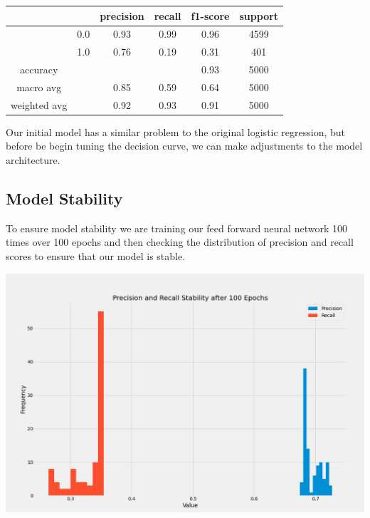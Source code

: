 \documentclass[12pt]{article}
\begin{document}
	\begin{tabular}{c|c|c|c|c|c}
	\hline
	& 		& 	precision &  recall  & f1-score   & support \\ \hline
	
	&  0.0	&		0.93 &     0.99   &  0.96   &  4599 \\ \hline
	&  1.0  &		0.76 &     0.19   &  0.31   &   401 \\ \hline
	
	accuracy    & & & &                       		  0.93   &   5000 \\ \hline
	macro avg   & &   			0.85   &   0.59  &    0.64   &   5000  \\ \hline
	weighted avg  & &   		0.92   &   0.93  &    0.91   &   5000 \\ \hline
	\end{tabular}
	
	Our initial model has a similar problem to the original logistic regression, but before be begin tuning the decision curve, we can make adjustments to the model architecture. 
	
	
	\subsection{Model Stability}
	
	To ensure model stability we are training our feed forward neural network 100 times over 100 epochs and then checking the distribution of precision and recall scores to ensure that our model is stable. 
	
	\begin{center}
		\includegraphics[scale=0.4]{../notebooks/StableNetwork.png}
	\end{center}
	
\end{document}
